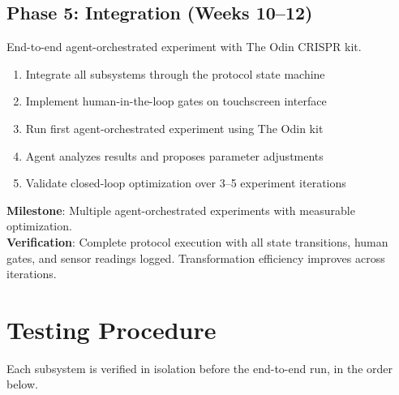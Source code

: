 \documentclass[11pt,letterpaper]{article}
\begin{document}
\subsection{Phase 5: Integration (Weeks 10--12)}
End-to-end agent-orchestrated experiment with The Odin CRISPR kit.

\begin{enumerate}
  \item Integrate all subsystems through the protocol state machine
  \item Implement human-in-the-loop gates on touchscreen interface
  \item Run first agent-orchestrated experiment using The Odin kit
  \item Agent analyzes results and proposes parameter adjustments
  \item Validate closed-loop optimization over 3--5 experiment iterations
\end{enumerate}

\textbf{Milestone}: Multiple agent-orchestrated experiments with measurable optimization.\\
\textbf{Verification}: Complete protocol execution with all state transitions, human gates, and sensor readings logged. Transformation efficiency improves across iterations.


\section{Testing Procedure}

Each subsystem is verified in isolation before the end-to-end run, in the order below.
\end{document}
